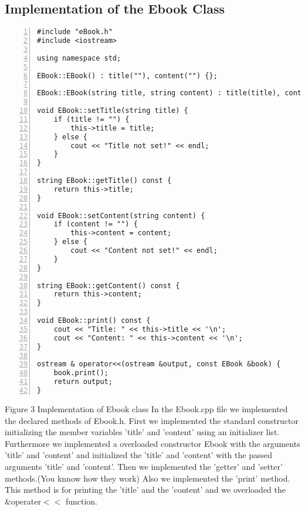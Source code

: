 \documentclass{llncs}
\begin{document}
\subsection{Implementation of the Ebook Class}
\begin{lstlisting}[basicstyle=\footnotesize\ttfamily, numbers=left, stepnumber=1, numberstyle = \normalsize]
#include "eBook.h"
#include <iostream>

using namespace std;

EBook::EBook() : title(""), content("") {};

EBook::EBook(string title, string content) : title(title), content(content) {};

void EBook::setTitle(string title) {
	if (title != "") {
		this->title = title;
	} else {
		cout << "Title not set!" << endl;
	}
}

string EBook::getTitle() const {
	return this->title;
}

void EBook::setContent(string content) {
	if (content != "") {
		this->content = content;
	} else {
		cout << "Content not set!" << endl;
	}
}

string EBook::getContent() const {
	return this->content;
}

void EBook::print() const {
	cout << "Title: " << this->title << '\n';
	cout << "Content: " << this->content << '\n';
}

ostream & operator<<(ostream &output, const EBook &book) {
	book.print();
	return output;
}
\end{lstlisting}
\scriptsize{Figure 3 Implementation of Ebook class}\newline
\newline
In the Ebook.cpp file we implemented the declared methods of Ebook.h.\newline
First we implemented the standard constructor initializing the member variables 'title' and 'content' using an initializer list. \newline
Furthermore we implemented a overloaded constructor Ebook with the arguments 'title' and 'content' and initialized the 'title' and 'content' with the passed arguments 'title' and 'content'.\newline
\newline
Then we implemented the 'getter' and 'setter' methods.(You knnow how they work)\newline
Also we implemented the 'print' method. This method is for printing the 'title' and the 'content' and we overloaded the \&operater$<<$ function.\newline
\end{document}
